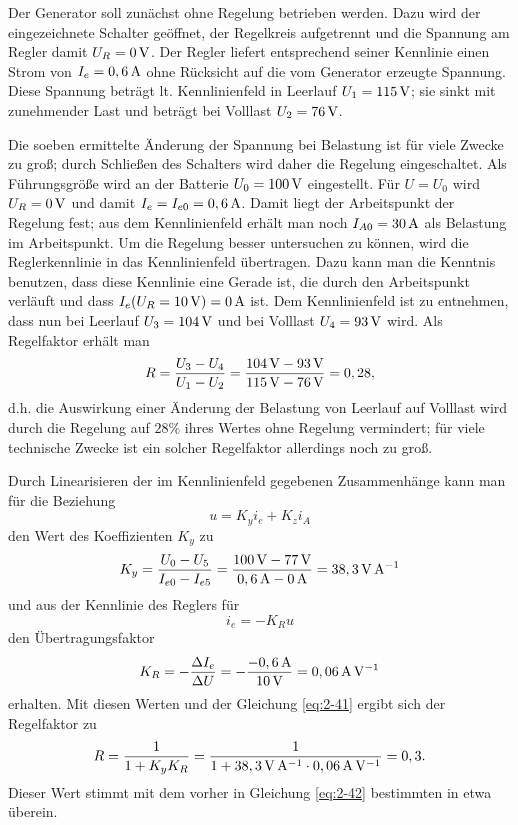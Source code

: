Der Generator soll zunächst ohne Regelung betrieben werden.
Dazu wird der eingezeichnete Schalter geöffnet, der Regelkreis aufgetrennt und die Spannung am Regler damit \(U_R = 0\,\si{\volt}\).
Der Regler liefert entsprechend seiner Kennlinie einen Strom von \(I_e= 0,6\,\si{\ampere}\) ohne Rücksicht auf die vom Generator erzeugte Spannung.
Diese Spannung beträgt lt. Kennlinienfeld in Leerlauf \(U_1 = 115\,\si{\volt}\); sie sinkt mit zunehmender Last und beträgt bei Volllast \(U_2 = 76\,\si{\volt}\).

Die soeben ermittelte Änderung der Spannung bei Belastung ist für viele Zwecke zu groß; durch Schließen des Schalters wird daher die Regelung eingeschaltet.
Als Führungsgröße wird an der Batterie \(U_0 = 100\,\si{\volt}\) eingestellt.
Für \(U = U_0\) wird \(U_R = 0\,\si{\volt}\) und damit \(I_e = I_{e0} = 0,6\,\si{\ampere}\).
Damit liegt der Arbeitspunkt der Regelung fest; aus dem Kennlinienfeld erhält man noch \(I_{A0} = 30\,\si{\ampere}\) als Belastung im Arbeitspunkt.
Um die Regelung besser untersuchen zu können, wird die Reglerkennlinie in das Kennlinienfeld übertragen.
Dazu kann man die Kenntnis benutzen, dass diese Kennlinie eine Gerade ist, die durch den Arbeitspunkt verläuft und dass \(I_e\parentheses*{U_R = 10\sis{\volt}} = 0\sis{\ampere}\) ist.
Dem Kennlinienfeld ist zu entnehmen, dass nun bei Leerlauf \(U_3 = 104\,\si{\volt}\) und bei Volllast \(U_4 = 93\,\si{\volt}\) wird.
Als Regelfaktor erhält man
\begin{equation}\label{eq:2-42}
    R = \frac{U_3 - U_4}{U_1 - U_2} = \frac{104\,\si{\volt} - 93\,\si{\volt}}{115\,\si{\volt} - 76\,\si{\volt}} = 0,28,
\end{equation}
d.h. die Auswirkung einer Änderung der Belastung von Leerlauf auf Volllast wird durch die Regelung auf \(28\%\) ihres Wertes ohne Regelung vermindert; für viele technische Zwecke ist ein solcher Regelfaktor allerdings noch zu groß.

Durch Linearisieren der im Kennlinienfeld gegebenen Zusammenhänge kann man für die Beziehung
\begin{equation}
    u = K_y i_e + K_z i_A
\end{equation}
den Wert des Koeffizienten \(K_y\) zu
\begin{equation}
    K_y = \frac{U_0 - U_5}{I_{e0} - I_{e5}} = \frac{100\,\si{\volt} - 77\,\si{\volt}}{0,6\,\si{\ampere} - 0\,\si{\ampere}} = 38,3\,\si{\volt\per\ampere}
\end{equation}
und aus der Kennlinie des Reglers für
\begin{equation}
    i_e = -K_R u
\end{equation}
den Übertragungsfaktor
\begin{equation}
    K_R = -\frac{\Delta I_e}{\Delta U} = -\frac{-0,6\,\si{\ampere}}{10\,\si{\volt}} = 0,06\,\si{\ampere\per\volt}
\end{equation}
erhalten.
Mit diesen Werten und der Gleichung \eqref{eq:2-41} ergibt sich der Regelfaktor zu
\begin{equation}
    R = \frac{1}{1 + K_y K_R} = \frac{1}{1 + 38,3\,\si{\volt\per\ampere} \cdot 0,06\,\si{\ampere\per\volt}} = 0,3.
\end{equation}
Dieser Wert stimmt mit dem vorher in Gleichung \eqref{eq:2-42} bestimmten in etwa überein.


